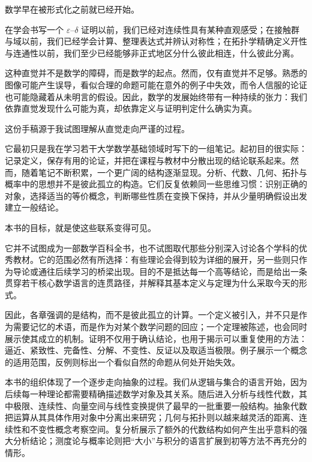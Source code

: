 
\prefacechapter
\thispagestyle{empty}

数学早在被形式化之前就已经开始。

在学会书写一个 $\varepsilon$--$\delta$ 证明以前，我们已经对连续性具有某种直观感受；在接触群与域以前，我们已经学会计算、整理表达式并辨认对称性；在拓扑学精确定义开性与连通性以前，我们至少已经能够非正式地区分什么彼此相连，什么彼此分离。

这种直觉并不是数学的障碍，而是数学的起点。然而，仅有直觉并不足够。熟悉的图像可能产生误导，看似合理的命题可能在意外的例子中失效，而令人信服的论证也可能隐藏着从未明言的假设。因此，数学的发展始终带有一种持续的张力：我们依靠直觉发现什么可能为真，却依靠定义与证明判定什么确实为真。

这份手稿源于我试图理解从直觉走向严谨的过程。

它最初只是我在学习若干大学数学基础领域时写下的一组笔记。起初目的很实际：记录定义，保存有用的论证，并把在课程与教材中分散出现的结论联系起来。然而，随着笔记不断积累，一个更广阔的结构逐渐显现。分析、代数、几何、拓扑与概率中的思想并不是彼此孤立的构造。它们反复依赖同一些思维习惯：识别正确的对象，选择适当的等价概念，判断哪些性质在变换下保持，并从少量明确假设出发建立一般结论。

本书的目标，就是使这些联系变得可见。

它并不试图成为一部数学百科全书，也不试图取代那些分别深入讨论各个学科的优秀教材。它的范围必然有所选择：有些理论会得到较为详细的展开，另一些则只作为导论或通往后续学习的桥梁出现。目的不是抵达每一个高等结论，而是给出一条贯穿若干核心数学语言的连贯路径，并解释其基本定义与定理为什么采取今天的形式。

因此，各章强调的是结构，而不是彼此孤立的计算。一个定义被引入，并不只是作为需要记忆的术语，而是作为对某个数学问题的回应；一个定理被陈述，也会同时展示使其成立的机制。证明不仅用于确认结论，也用于揭示可以重复使用的方法：逼近、紧致性、完备性、分解、不变性、反证以及取适当极限。例子展示一个概念的适用范围，反例则标出一个看似自然的命题从何处开始失效。

本书的组织体现了一个逐步走向抽象的过程。我们从逻辑与集合的语言开始，因为后续每一种理论都需要精确描述数学对象及其关系。随后进入分析与线性代数，其中极限、连续性、向量空间与线性变换提供了最早的一批重要一般结构。抽象代数把运算从其具体作用对象中分离出来研究；几何与拓扑则以越来越灵活的距离、连续性和不变性概念考察空间。复分析展示了额外的代数结构如何产生出乎意料的强大分析结论；测度论与概率论则把“大小”与积分的语言扩展到初等方法不再充分的情形。

